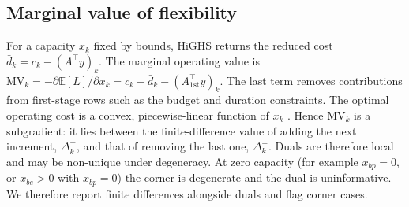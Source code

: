 \subsection{Marginal value of flexibility}
\label{sec:marginal}
For a capacity $x_k$ fixed by bounds, HiGHS returns the reduced cost $\bar d_k=c_k-(A^\top y)_k$. The marginal
operating value is $\mathrm{MV}_k=-\partial\mathbb{E}[L]/\partial x_k=c_k-\bar d_k-(A_{\text{1st}}^\top y)_k$.
The last term removes contributions from first-stage rows such as the budget and duration constraints. The
optimal operating cost is a convex, piecewise-linear function of $x_k$ \cite{bertsimas1997lp}. Hence
$\mathrm{MV}_k$ is a subgradient: it lies between the finite-difference value of adding the next increment,
$\Delta^+_k$, and that of removing the last one, $\Delta^-_k$. Duals are therefore local and may be non-unique
under degeneracy. At zero capacity (for example $x_{bp}=0$, or $x_{be}>0$ with $x_{bp}=0$) the corner is
degenerate and the dual is uninformative. We therefore report finite differences alongside duals and flag
corner cases.
